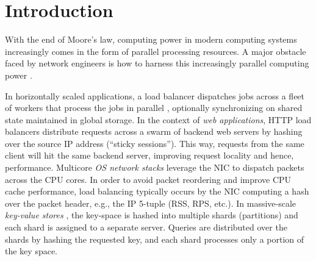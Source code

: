 \section{Introduction}\label{sec:introduction}










With the end of Moore's law, computing power in modern computing systems increasingly comes in the form of parallel processing resources.  A major obstacle faced by network engineers is how to harness this increasingly parallel computing power \cite{265065, 10.5555/3307441.3307467, 10.1145/2815400.2815423, 10.1145/3098822.3098826, 10.5555/3154630.3154639}.

In horizontally scaled applications, a load balancer dispatches jobs across a fleet of workers that process the jobs in parallel \cite{10.5555/3235491}, optionally synchronizing on shared state maintained in global storage.  In the context of \emph{web applications}, HTTP load balancers \cite{194966, 211279, 9552525} distribute requests across a swarm of backend web servers by hashing over the source IP address (``sticky sessions''). This way, requests from the same client will hit the same backend server, improving request locality and hence, performance. %
Multicore \emph{OS network stacks} \cite{211263, 10.1145/3359989.3365412, 10.1145/3452296.3472914} leverage the NIC to dispatch packets across the CPU cores. In order to avoid packet reordering and improve CPU cache performance, load balancing typically occurs by the NIC computing a hash over the packet header, e.g., the IP 5-tuple (RSS, RPS, etc.).  In massive-scale \emph{key-value stores} \cite{ghigoff2021bmc}, the key-space is hashed into multiple shards (partitions) and each shard is assigned to a separate server. Queries are distributed over the shards by hashing the requested key, and each shard processes only a portion of the key space.

